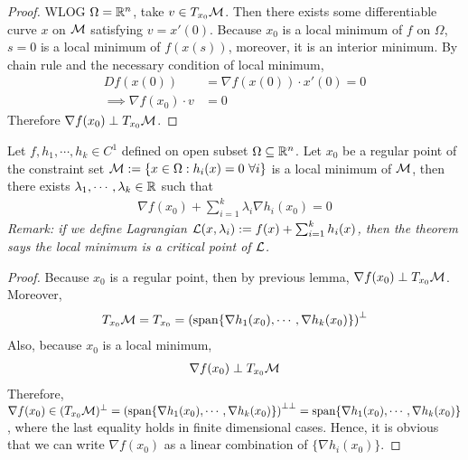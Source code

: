 \documentclass{article}
\begin{document}
   	\begin{proof}
   		WLOG $\Omega = \mathbb{R}^n$, take $v \in T_{x_0} \mathcal{{M}}$. Then there exists some differentiable curve $x$ on $\mathcal{{M}}$ satisfying $v = x'(0)$. Because $x_0$ is a local minimum of $f$ on $\Omega$, $s=0$ is a local minimum of $f(x(s))$, moreover, it is an interior minimum. By chain rule and the necessary condition of local minimum,
   		\begin{align}
   			D f(x(0)) &= \nabla f (x(0)) \cdot x'(0) = 0 \\
   			\implies \nabla f(x_0) \cdot v &= 0
   		\end{align}
   		Therefore $\nabla f(x_0) \perp T_{x_0} \mathcal{{M}}$.
   	\end{proof}
   	
   	\begin{theorem}
   		Let $f, h_1, \cdots, h_k \in C^1$ defined on open subset $\Omega \subseteq \mathbb{R}^n$. Let $x_0$ be a regular point of the constraint set $\mathcal{{M}} := \{x \in \Omega: h_i(x) = 0\ \forall i \}$ is a local minimum of $\mathcal{{M}}$, then there exists $\lambda_1, \cdots, \lambda_k \in \mathbb{R}$ such that
   		\begin{align}
   			\nabla f(x_0) + \sum_{i=1}^k \lambda_i \nabla h_i(x_0) = 0
   		\end{align}
   		\emph{Remark: if we define Lagrangian $\mathcal{{L}}(x, \lambda_i) := f(x) + \sum_{i=1}^k h_i(x)$, then the theorem says the local minimum is a critical point of $\mathcal{{L}}$.}
   	\end{theorem}
   	
   	\begin{proof}
   		Because $x_0$ is a regular point, then by previous lemma, $\nabla f(x_0) \perp T_{x_0} \mathcal{{M}}$. Moreover,
   		\begin{align}
   			T_{x_0} \mathcal{{M}} = T_{x_0} = \left (\text{{span}}\{\nabla h_1 (x_0), \cdots, \nabla h_k(x_0)\} \right )^\perp
   		\end{align}
   		Also, because $x_0$ is a local minimum, 
   		\begin{align}
   			\nabla f(x_0) \perp T_{x_0} \mathcal{{M}}
   		\end{align}
   		Therefore, $\nabla f(x_0) \in (T_{x_0} \mathcal{{M}})^\perp = \left (\text{{span}}\{\nabla h_1 (x_0), \cdots, \nabla h_k(x_0)\} \right )^{\perp \perp} = \text{{span}}\{\nabla h_1 (x_0), \cdots, \nabla h_k(x_0)\}$, where the last equality holds in finite dimensional cases. Hence, it is obvious that we can write $\nabla f(x_0)$ as a linear combination of $\{\nabla h_i(x_0)\}$.
   	\end{proof}
   	
\end{document}
